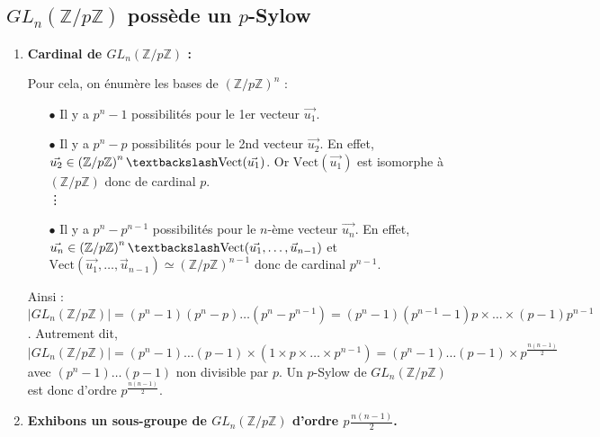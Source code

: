 \documentclass{report}
\newcommand{\Z}{\mathbb{Z}}
\begin{document}
\subsection{$GL_n\left( \Z /p\Z \right) $ possède un $p$-Sylow}     
\begin{enumerate}
            
            \item \textbf{Cardinal de $GL_n\left( \Z /p\Z \right) $ : }

            
           Pour cela, on énumère les bases de $\left( \Z /p\Z \right) ^n$ : 
            
            \begin{itemize}
                \item [$\bullet$]Il y a $p^n-1$ possibilités pour le 1er vecteur $\vec{u_1}.$
                \item [$\bullet$] Il y a $p^n-p$ possibilités pour le 2nd vecteur $\vec{u_2}$. En effet, $\vec{u_2} \in  \left ( \Z / p\Z \right)^n \textbackslash \text{Vect}(\vec{u_1})$. Or $\text{Vect}(\vec{u_1})$ est isomorphe à $ \left ( \Z / p\Z \right)$ donc de cardinal $p$. \\ \vdots
                \item [$\bullet$] Il y a $p^n-p^{n-1}$ possibilités pour le $n$-ème vecteur $\vec{u_n}.$ \newline En effet, $\vec{u_n} \in  \left ( \Z / p\Z \right)^n \textbackslash \text{Vect}(\vec{u_1}, \dots, \vec{u}_{n-1})$ et $\text{Vect}(\vec{u_1}, \dots, \vec{u}_{n-1}) \simeq \left ( \Z / p\Z \right)^{n-1}$ donc de cardinal $p^{n-1}$.
            \end{itemize}
            
            Ainsi : \newline $| GL_n\left( \Z / p\Z \right)| = (p^n-1)(p^n-p) \dots (p^n-p^{n-1}) = (p^n-1)(p^{n-1}-1) p \times \dots \times (p-1)p^{n-1}$.  \vspace{2mm} \newline 
            Autrement dit,  \newline $| GL_n\left ( \Z / p\Z \right) | = (p^n-1) \dots (p-1)\times (1\times p \times \dots \times p^{n-1}) = (p^n-1) \dots (p-1)\times p^{\tfrac{n(n-1)}{2}} $
            \newline avec $(p^n-1) \dots (p-1)$ non divisible par $p$. Un $p$-Sylow de $GL_n\left( \Z /p\Z \right)$ est donc d'ordre $p^{\tfrac{n(n-1)}{2}}$.


            \item \textbf{Exhibons un sous-groupe de $GL_n(\Z / p\Z)$ d'ordre $p^{}\tfrac{n(n-1)}{2}$.} 
            

\end{enumerate}
\end{document}
